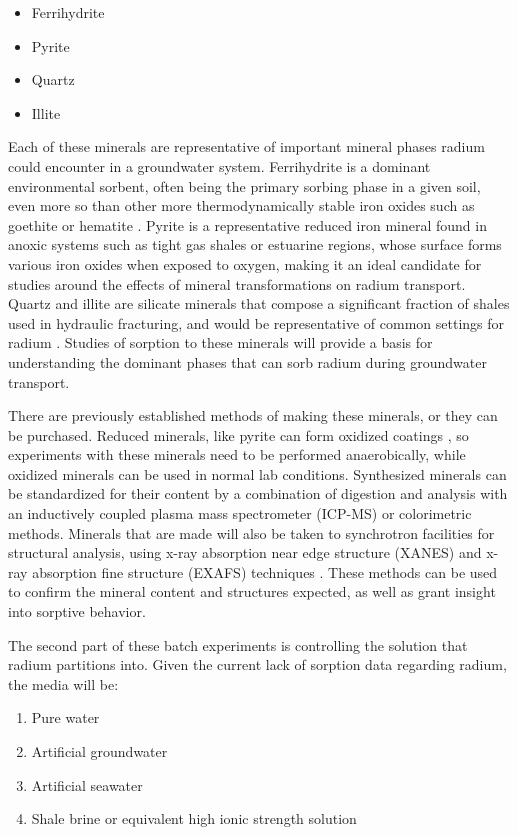 \documentclass[twoside,12pt,titlepage]{article}
\begin{document}
\begin{itemize}
	\item Ferrihydrite
	\item Pyrite
	\item Quartz
	\item Illite
\end{itemize}

\par Each of these minerals are representative of important mineral phases radium could encounter in a groundwater system. Ferrihydrite is a dominant environmental sorbent, often being the primary sorbing phase in a given soil, even more so than other more thermodynamically stable iron oxides such as goethite or hematite \cite{Michel2007}. Pyrite is a representative reduced iron mineral found in anoxic systems such as tight gas shales or estuarine regions, whose surface forms various iron oxides when exposed to oxygen, making it an ideal candidate for studies around the effects of mineral transformations on radium transport. Quartz and illite are silicate minerals that compose a significant fraction of shales used in hydraulic fracturing, and would be representative of common settings for radium \cite{Chermak2014}. Studies of sorption to these minerals will provide a basis for understanding the dominant phases that can sorb radium during groundwater transport.
\par There are previously established methods of making these minerals, or they can be purchased. Reduced minerals, like pyrite can form oxidized coatings \cite{Buckley1987}, so experiments with these minerals need to be performed anaerobically, while oxidized minerals can be used in normal lab conditions. Synthesized minerals can be standardized for their content by a combination of digestion and analysis with an inductively coupled plasma mass spectrometer (ICP-MS) or colorimetric methods. Minerals that are made will also be taken to synchrotron facilities for structural analysis, using x-ray absorption near edge structure (XANES) and x-ray absorption fine structure (EXAFS) techniques \cite{Fendorf1999}. These methods can be used to confirm the mineral content and structures expected, as well as grant insight into sorptive behavior.
\par The second part of these batch experiments is controlling the solution that radium partitions into. Given the current lack of sorption data regarding radium, the media will be:

\begin{enumerate}[label = \roman*)]
	\item Pure water
	\item Artificial groundwater
	\item Artificial seawater
	\item Shale brine or equivalent high ionic strength solution
\end{enumerate}
\end{document}
